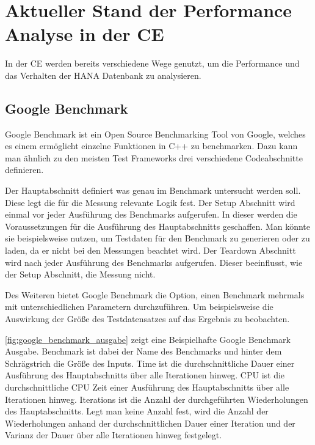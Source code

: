 \chapter{Aktueller Stand der Performance Analyse in der \acl{CE}}
\label{sec:analyse}
In der \ac{CE} werden bereits verschiedene Wege genutzt, um die Performance und
das Verhalten der HANA Datenbank zu analysieren. 
\section{Google Benchmark}
\label{sec:google_benchmark}

Google Benchmark ist ein Open Source Benchmarking Tool von Google,
welches es einem ermöglicht einzelne Funktionen in C++ zu benchmarken. 
Dazu kann man ähnlich zu den meisten Test Frameworks drei verschiedene
Codeabschnitte definieren.

Der Hauptabschnitt definiert was genau im Benchmark untersucht werden
soll. Diese legt die für die Messung relevante Logik fest.
Der Setup Abschnitt wird einmal vor jeder Ausführung des Benchmarks
aufgerufen. In dieser werden die Voraussetzungen für die Ausführung des Hauptabschnitts
geschaffen. Man könnte sie beispielsweise nutzen, um Testdaten für den Benchmark
zu generieren oder zu laden, da er nicht bei den Messungen beachtet wird.
Der Teardown Abschnitt wird nach jeder Ausführung des Benchmarks aufgerufen.
Dieser beeinflusst, wie der Setup Abschnitt, die Messung nicht.

Des Weiteren bietet Google Benchmark die Option, einen Benchmark mehrmals mit
unterschiedlichen Parametern durchzuführen. Um beispielsweise die Auswirkung
der Größe des Testdatensatzes auf das Ergebnis zu beobachten.

\autoref{fig:google_benchmark_ausgabe} zeigt eine Beispielhafte Google
Benchmark Ausgabe. Benchmark ist dabei der Name des Benchmarks und hinter dem
Schrägstrich die Größe des Inputs. \foreignlanguage{english}{Time} ist die durchschnittliche Dauer einer
Ausführung des Hauptabschnitts über alle Iterationen hinweg. CPU ist die
durchschnittliche CPU Zeit einer Ausführung des Hauptabschnitts über alle
Iterationen hinweg. \foreignlanguage{english}{Iterations} ist die Anzahl der durchgeführten Wiederholungen
des Hauptabschnitts. Legt man keine Anzahl fest, wird die Anzahl der
Wiederholungen anhand der durchschnittlichen Dauer einer Iteration und der
Varianz der Dauer über alle Iterationen hinweg festgelegt.
\autocite[Vgl.][]{GoogleBenchmark}


